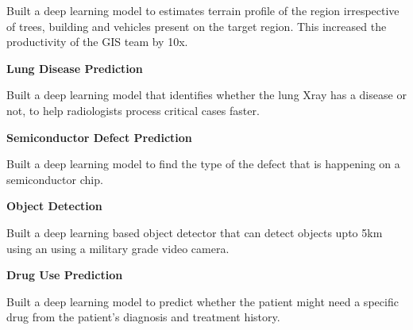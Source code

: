 \documentclass[letterpaper,MMMyyyy,nonstopmode]{simpleresumecv}
\begin{document}
\begin{Body}
                    \Gap

                    \Item
                        Built a deep learning model to estimates terrain profile of the 
                        region irrespective of trees, building and vehicles present on the target region. 
                        This increased the productivity of the GIS team by 10x.
                
                
                \BigGap

                \Entry
                    \textbf{Lung Disease Prediction}

                    \Gap

                    \Item
                        Built a deep learning model that identifies whether the 
                        lung Xray has a disease or not, to help  radiologists 
                        process critical cases faster.
                
                
                \BigGap


                \Entry
                    \textbf{Semiconductor Defect Prediction}

                    \Gap

                    \Item
                        Built a deep learning model to find the type of the 
                        defect that is happening on a semiconductor chip.
                
                
                \BigGap

                \Entry
                    \textbf{Object Detection}

                    \Gap

                    \Item
                        Built a deep learning based object detector that can detect 
                        objects upto 5km using an using a military grade video camera.
                
                
                \BigGap

                \Entry
                    \textbf{Drug Use Prediction}

                    \Gap

                    \Item
                        Built a deep learning model to predict whether the patient might 
                        need a specific drug from the patient's diagnosis and treatment history.
                
                
                \BigGap


\end{Body}
\end{document}
